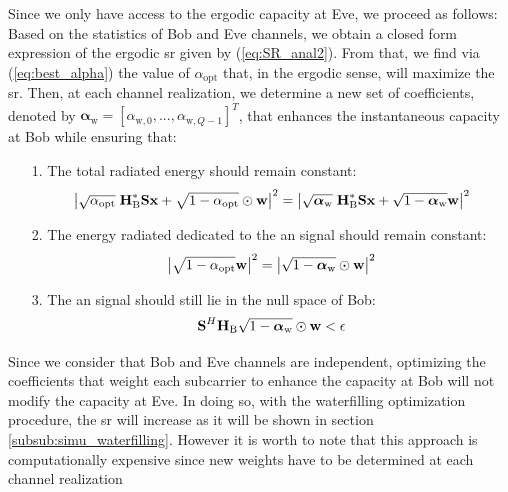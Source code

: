 Since we only have access to the ergodic capacity at Eve, we proceed as follows:\\
Based on the statistics of Bob and Eve channels, we obtain a closed form expression of the ergodic \gls{sr} given by (\ref{eq:SR_anal2}). From that, we find via (\ref{eq:best_alpha}) the value of $\alpha_{\text{opt}}$ that, in the ergodic sense, will maximize the \gls{sr}. Then, at each channel realization, we determine a new set of coefficients, denoted by $\boldsymbol\alpha_{\text{w}} = [\alpha_{\text{w},0},...,\alpha_{\text{w},Q-1}]^T $, that enhances the instantaneous capacity at Bob while ensuring that:
\begin{itemize}
    \item[1.] The total radiated energy should remain constant:
    \begin{equation}
        \left|\sqrt{\alpha_{\text{opt}}} \;\textbf{H}_{\text{B}}^* \textbf{S} \textbf{x} + \sqrt{1-\alpha_{\text{opt}}} \odot  \textbf{w} \right|^2  =   \left|\sqrt{\boldsymbol\alpha_{\text{w}}} \; \textbf{H}_{\text{B}}^* \textbf{S} \textbf{x} + \sqrt{1-\boldsymbol\alpha_{\text{w}}} \textbf{w} \right|^2
    \end{equation}
    \item[2.] The energy radiated dedicated to the \gls{an} signal should remain constant:
    \begin{equation}
        \left|\sqrt{1-\alpha_{\text{opt}}}\textbf{w}\right|^2 = \left|\sqrt{1-\boldsymbol\alpha_{\text{w}}} \odot\textbf{w}\right|^2
    \end{equation}
    \item[3.] The \gls{an} signal should still lie in the null space of Bob:
    \begin{equation}
        \textbf{S}^H \textbf{H}_{\text{B}} \sqrt{1-\boldsymbol\alpha_{\text{w}}}\odot \textbf{w} < \epsilon
    \end{equation}
\end{itemize}
Since we consider that Bob and Eve channels are independent, optimizing the coefficients that weight each subcarrier to enhance the capacity at Bob will not modify the capacity at Eve. In doing so, with the waterfilling optimization procedure, the \gls{sr} will increase as it will be shown in section \ref{subsub:simu_waterfilling}. However it is worth to note that this approach is computationally expensive since new weights have to be determined at each channel realization